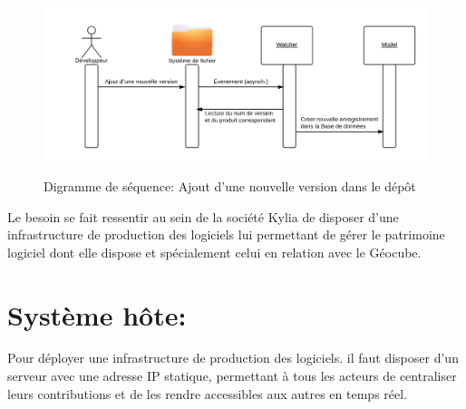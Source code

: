 \documentclass{themeensg}
\newcommand{\ensg}{\textsc{Ensg}}
\begin{document}
\begin{figure}
\centering\includegraphics[scale=0.8]{images/seq_dev.png}
\label{fig:seq_dev}
\caption{Digramme de séquence: Ajout d'une nouvelle version dans le dépôt}
\end{figure}

Le besoin se fait ressentir au sein de la société Kylia de disposer d'une infrastructure de production des logiciels lui permettant de gérer le patrimoine logiciel dont elle dispose et spécialement celui en relation avec le Géocube.  

\section{Système hôte:}

Pour déployer une infrastructure de production des logiciels. il faut disposer d'un serveur avec une adresse IP statique, permettant à tous les acteurs de centraliser leurs contributions et de les rendre accessibles aux autres en temps réel.
\end{document}
